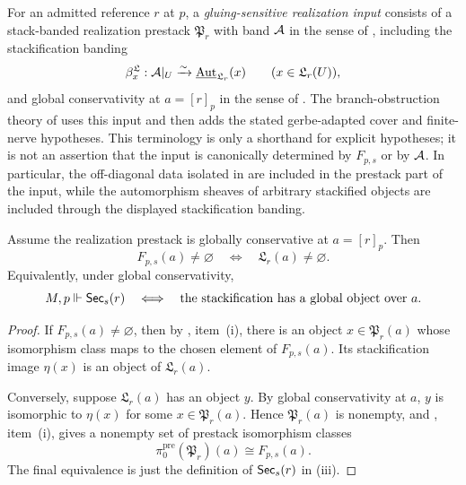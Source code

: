 \begin{definition}\label{def:gluing-sensitive-realization-input}
For an admitted reference $r$ at $p$, a \emph{gluing-sensitive realization
input} consists of a stack-banded realization prestack $\mathfrak P_r$ with
band $\mathcal{A}$ in the sense of , including the
stackification banding
\[
\beta^{\mathfrak L}_x:\mathcal{A}|_U\xrightarrow{\sim}
\underline{\mathrm{Aut}}_{\mathfrak L_r}(x)
\qquad (x\in\mathfrak L_r(U)),
\]
and global conservativity at $a=[r]_p$ in the sense of
. The branch-obstruction theory of
 uses this input and
then adds the stated gerbe-adapted cover and finite-nerve hypotheses. This
terminology is only a shorthand for explicit hypotheses; it is not an assertion
that the input is canonically determined by $F_{p,s}$ or by $\mathcal{A}$. In
particular, the off-diagonal data isolated in
are included in the prestack part of the input, while the automorphism sheaves
of arbitrary stackified objects are included through the displayed
stackification banding.
\end{definition}

\begin{proposition}\label{prop:no-new-global-objects}
Assume the realization prestack is globally conservative at $a=[r]_p$. Then
\[
F_{p,s}(a)\neq\varnothing
\quad\Longleftrightarrow\quad
\mathfrak L_r(a)\neq\varnothing .
\]
Equivalently, under global conservativity,
\[
M,p\Vdash \mathsf{Sec}_s(r)
\quad\Longleftrightarrow\quad
\text{the stackification has a global object over }a .
\]
\end{proposition}

\begin{proof}
If $F_{p,s}(a)\neq\varnothing$, then by
, item~\textup{(i)}, there is an object
$x\in\mathfrak P_r(a)$ whose isomorphism class maps to the chosen element of
$F_{p,s}(a)$. Its stackification image $\eta(x)$ is an object of
$\mathfrak L_r(a)$.

Conversely, suppose $\mathfrak L_r(a)$ has an object $y$. By global
conservativity at $a$, $y$ is isomorphic to $\eta(x)$ for some
$x\in\mathfrak P_r(a)$. Hence $\mathfrak P_r(a)$ is nonempty, and
, item~\textup{(i)}, gives a nonempty set of
prestack isomorphism classes
\[
\pi_0^{\mathrm{pre}}(\mathfrak P_r)(a)\cong F_{p,s}(a).
\]
The final equivalence is just the definition of $\mathsf{Sec}_s(r)$ in
(iii).
\end{proof}

